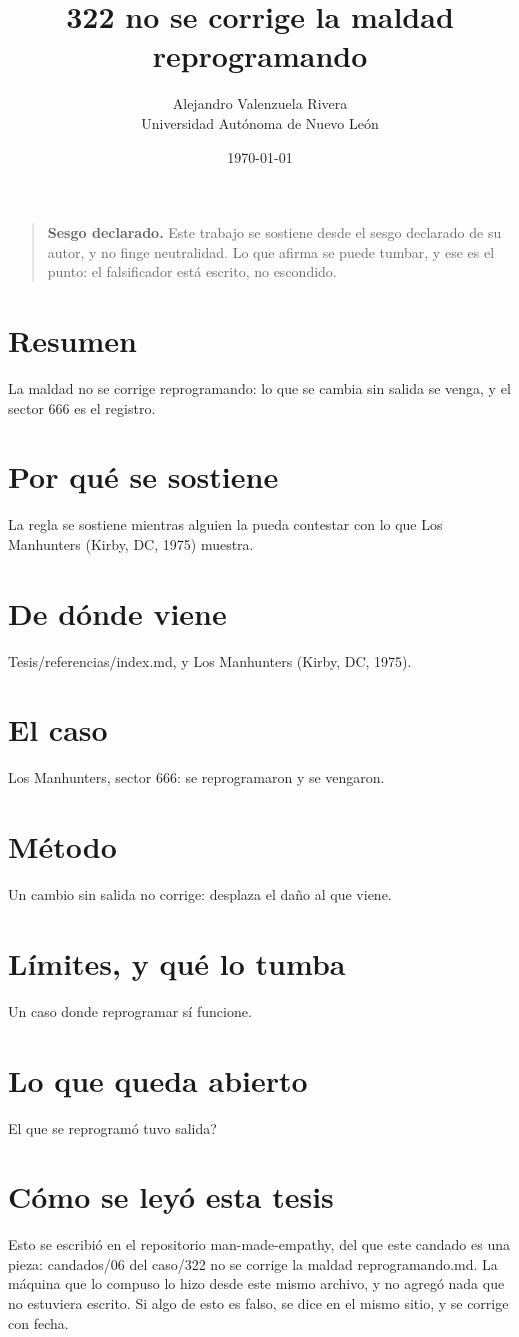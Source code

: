 \documentclass[11pt,a4paper]{article}
\title{322 no se corrige la maldad reprogramando}
\author{Alejandro Valenzuela Rivera\\\small Universidad Autónoma de Nuevo León}
\date{\today}
\begin{document}
\maketitle

\begin{quote}
\textbf{Sesgo declarado.} Este trabajo se sostiene desde el sesgo declarado de su autor, y no finge neutralidad. Lo que afirma se puede tumbar, y ese es el punto: el falsificador está escrito, no escondido.
\end{quote}

\section*{Resumen}
La maldad no se corrige reprogramando: lo que se cambia sin salida se venga, y el sector 666 es el registro.

\section{Por qué se sostiene}
La regla se sostiene mientras alguien la pueda contestar con lo que Los Manhunters (Kirby, DC, 1975) muestra.

\section{De dónde viene}
Tesis/referencias/index.md, y Los Manhunters (Kirby, DC, 1975).

\section{El caso}
Los Manhunters, sector 666: se reprogramaron y se vengaron.

\section{Método}
Un cambio sin salida no corrige: desplaza el daño al que viene.

\section{Límites, y qué lo tumba}
Un caso donde reprogramar sí funcione.

\section{Lo que queda abierto}
\textquestiondown{}El que se reprogramó tuvo salida?

\section*{Cómo se leyó esta tesis}
Esto se escribió en el repositorio man-made-empathy, del que este candado es una pieza: candados/06 del caso/322 no se corrige la maldad reprogramando.md. La máquina que lo compuso lo hizo desde este mismo archivo, y no agregó nada que no estuviera escrito. Si algo de esto es falso, se dice en el mismo sitio, y se corrige con fecha.
\end{document}
